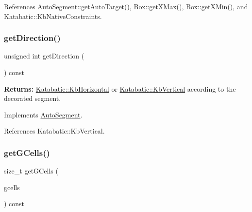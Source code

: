 References Auto\+Segment\+::get\+Auto\+Target(), Box\+::get\+X\+Max(), Box\+::get\+X\+Min(), and Katabatic\+::\+Kb\+Native\+Constraints.

\mbox{\label{classKatabatic_1_1AutoVertical_a0dd7cf705ace42c662c289955313b2e9}} 
\subsubsection{\texorpdfstring{get\+Direction()}{getDirection()}}
{\footnotesize\ttfamily unsigned int get\+Direction (\begin{DoxyParamCaption}{ }\end{DoxyParamCaption}) const\hspace{0.3cm}{\ttfamily [virtual]}}

{\bfseries Returns\+:} \mbox{\hyperlink{namespaceKatabatic_a2af2ad6b6441614038caf59d04b3b217a1a9045673c5d3c30b067100f1440ae1b}{Katabatic\+::\+Kb\+Horizontal}} or \mbox{\hyperlink{namespaceKatabatic_a2af2ad6b6441614038caf59d04b3b217a284cad95203a27172838b09e396e3590}{Katabatic\+::\+Kb\+Vertical}} according to the decorated segment. 

Implements \mbox{\hyperlink{classKatabatic_1_1AutoSegment_ae35b78590ed6aa546b626ef95f28c533}{Auto\+Segment}}.



References Katabatic\+::\+Kb\+Vertical.

\mbox{\label{classKatabatic_1_1AutoVertical_accdaef4410043f64da247a94a309733e}} 
\subsubsection{\texorpdfstring{get\+G\+Cells()}{getGCells()}}
{\footnotesize\ttfamily size\+\_\+t get\+G\+Cells (\begin{DoxyParamCaption}\item[{vector$<$ \mbox{\hyperlink{classKatabatic_1_1GCell}{G\+Cell}} $\ast$$>$ \&}]{gcells }\end{DoxyParamCaption}) const\hspace{0.3cm}{\ttfamily [virtual]}}


